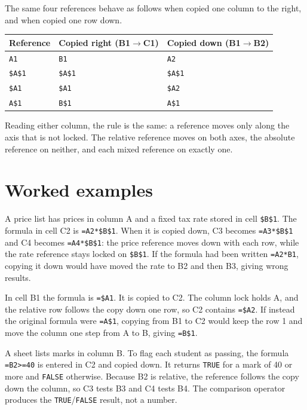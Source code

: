 The same four references behave as follows when copied one column to the
right, and when copied one row down.

\begin{center}
\begin{tabular}{p{}p{}p{}}
\toprule
\textbf{Reference} & \textbf{Copied right (B1$\rightarrow$C1)} & \textbf{Copied down (B1$\rightarrow$B2)} \\
\midrule
\texttt{A1} & \texttt{B1} & \texttt{A2} \\
\texttt{\$A\$1} & \texttt{\$A\$1} & \texttt{\$A\$1} \\
\texttt{\$A1} & \texttt{\$A1} & \texttt{\$A2} \\
\texttt{A\$1} & \texttt{B\$1} & \texttt{A\$1} \\
\bottomrule
\end{tabular}
\end{center}

Reading either column, the rule is the same: a reference moves only along the
axis that is not locked. The relative reference moves on both axes, the
absolute reference on neither, and each mixed reference on exactly one.

\section{Worked examples}

\begin{example}
A price list has prices in column A and a fixed tax rate stored in cell
\texttt{\$B\$1}. The formula in cell C2 is \texttt{=A2*\$B\$1}. When it is
copied down, C3 becomes \texttt{=A3*\$B\$1} and C4 becomes \texttt{=A4*\$B\$1}:
the price reference moves down with each row, while the rate reference stays
locked on \texttt{\$B\$1}. If the formula had been written \texttt{=A2*B1},
copying it down would have moved the rate to B2 and then B3, giving wrong
results.
\end{example}

\begin{example}
In cell B1 the formula is \texttt{=\$A1}. It is copied to C2. The column lock
holds A, and the relative row follows the copy down one row, so C2 contains
\texttt{=\$A2}. If instead the original formula were \texttt{=A\$1}, copying
from B1 to C2 would keep the row 1 and move the column one step from A to B,
giving \texttt{=B\$1}.
\end{example}

\begin{example}
A sheet lists marks in column B. To flag each student as passing, the formula
\texttt{=B2>=40} is entered in C2 and copied down. It returns \texttt{TRUE}
for a mark of 40 or more and \texttt{FALSE} otherwise. Because B2 is relative,
the reference follows the copy down the column, so C3 tests B3 and C4 tests
B4. The comparison operator produces the \texttt{TRUE}/\texttt{FALSE} result,
not a number.
\end{example}

